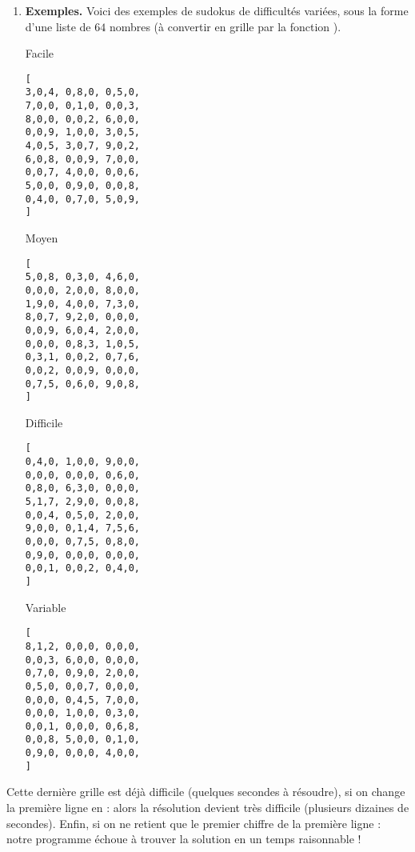 \documentclass[11pt,class=report,crop=false]{standalone}
\begin{document}
\begin{activite}[Sudoku]
\begin{enumerate}
  \item \textbf{Exemples.} 
  Voici des exemples de sudokus de difficultés variées, sous la forme d'une liste de $64$ nombres (à convertir en grille par la fonction ).
  
\begin{center}
\begin{minipage}{0.2\textwidth}
Facile
\begin{lstlisting}
[ 
3,0,4, 0,8,0, 0,5,0,
7,0,0, 0,1,0, 0,0,3, 
8,0,0, 0,0,2, 6,0,0,
0,0,9, 1,0,0, 3,0,5,
4,0,5, 3,0,7, 9,0,2,
6,0,8, 0,0,9, 7,0,0,
0,0,7, 4,0,0, 0,0,6,
5,0,0, 0,9,0, 0,0,8,
0,4,0, 0,7,0, 5,0,9,
]
\end{lstlisting}
\end{minipage} 
\end{center}

 \begin{center}
 \begin{minipage}{0.2\textwidth}
 Moyen
\begin{lstlisting}
[ 
5,0,8, 0,3,0, 4,6,0,
0,0,0, 2,0,0, 8,0,0, 
1,9,0, 4,0,0, 7,3,0,
8,0,7, 9,2,0, 0,0,0,
0,0,9, 6,0,4, 2,0,0,
0,0,0, 0,8,3, 1,0,5,
0,3,1, 0,0,2, 0,7,6,
0,0,2, 0,0,9, 0,0,0,
0,7,5, 0,6,0, 9,0,8,
]
\end{lstlisting} 
\end{minipage}
\end{center}

 \begin{center}
 \begin{minipage}{0.2\textwidth}
 Difficile
\begin{lstlisting}
[ 
0,4,0, 1,0,0, 9,0,0,
0,0,0, 0,0,0, 0,6,0, 
0,8,0, 6,3,0, 0,0,0,
5,1,7, 2,9,0, 0,0,8,
0,0,4, 0,5,0, 2,0,0,
9,0,0, 0,1,4, 7,5,6,
0,0,0, 0,7,5, 0,8,0,
0,9,0, 0,0,0, 0,0,0,
0,0,1, 0,0,2, 0,4,0,
]
\end{lstlisting} 
\end{minipage}
\end{center}

\begin{center}
\begin{minipage}{0.2\textwidth}
Variable
\begin{lstlisting}
[ 
8,1,2, 0,0,0, 0,0,0,
0,0,3, 6,0,0, 0,0,0, 
0,7,0, 0,9,0, 2,0,0,
0,5,0, 0,0,7, 0,0,0,
0,0,0, 0,4,5, 7,0,0,
0,0,0, 1,0,0, 0,3,0,
0,0,1, 0,0,0, 0,6,8,
0,0,8, 5,0,0, 0,1,0,
0,9,0, 0,0,0, 4,0,0,
]
\end{lstlisting} 
\end{minipage}
\end{center}
\end{enumerate} 

Cette dernière grille est déjà difficile (quelques secondes à résoudre),
si on change la première ligne en :
alors la résolution devient très difficile (plusieurs dizaines de secondes). Enfin, 
si on ne retient que le premier chiffre de la première ligne :
notre programme échoue à trouver la solution en un temps raisonnable !
\end{activite}
\end{document}
